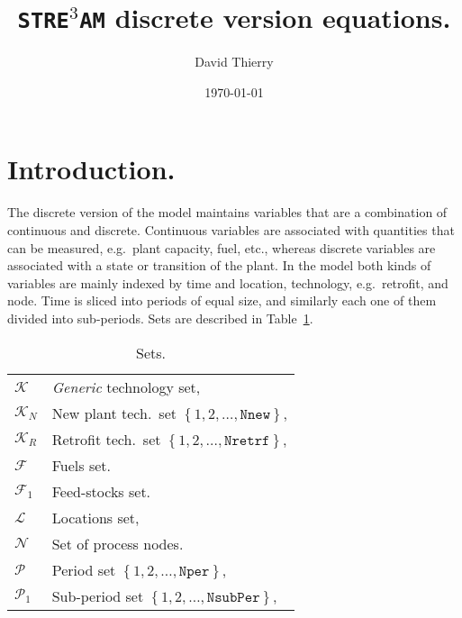 \documentclass{amsbook}
\newcommand{\stream}{\texttt{STRE$^{3}$AM}}
\begin{document}
\title{\stream{} discrete version equations.}
\author{David Thierry}
\address{Energy Systems and Infrastructure Analysis Division\\
Argonne National Laboratory\\
9700 S Cass Ave., Lemont, IL}
\date{\today}
\maketitle

\section{Introduction.}
%
The discrete version of the model maintains variables that are a combination of
continuous and discrete. Continuous variables are associated with quantities
that can be measured, e.g.\ plant capacity, fuel, etc., whereas discrete variables are
associated with a state or transition of the plant. 
%
In the model both kinds of variables are mainly indexed by time and
location, technology, e.g.\ retrofit, and node. 
%
Time is sliced into periods of equal size, and similarly each one of them
divided into sub-periods. Sets are described in Table~\ref{tab:sets}.
%
\begin{table}[h]
    \caption{Sets.}
    \begin{tabular}{@{}ll@{}}
        $\mathcal{K}$ & \textit{Generic} technology set,\\
        $\mathcal{K}_N$ & New plant tech.\ set $\left\{1,2,\dots,\mathtt{Nnew}\right\}$,\\
        $\mathcal{K}_R$ & Retrofit tech.\ set $\left\{1,2,\dots,\mathtt{Nretrf}\right\}$,\\
        $\mathcal{F}$ & Fuels set.\\
        $\mathcal{F}_1$	& Feed-stocks set.\\
        $\mathcal{L}$ & Locations set,\\
        $\mathcal{N}$ & Set of process nodes. \\
        $\mathcal{P}$	& Period set $\left\{1,2,\dots,\mathtt{Nper}\right\}$, \\
        $\mathcal{P}_1$	& Sub-period set $\left\{1,2,\dots,\mathtt{NsubPer}\right\}$,\\
    \end{tabular}\label{tab:sets}
\end{table}
%
\end{document}
